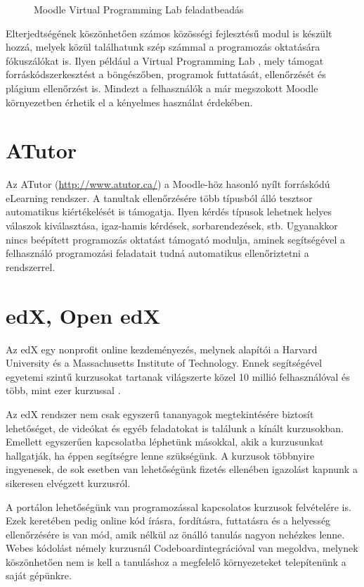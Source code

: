 \begin{figure}[h]
    \centering
    \caption{Moodle Virtual Programming Lab feladatbeadás}
    \label{fig:moodle_vpl}
\end{figure}

Elterjedtségének köszönhetően számos közösségi fejlesztésű modul is készült hozzá, melyek közül találhatunk szép számmal a programozás oktatására fókuszálókat is. Ilyen például a Virtual Programming Lab \cite{VPL} \cite{VPLJournal}, mely támogat forráskódszerkesztést a böngészőben, programok futtatását, ellenőrzését és plágium ellenőrzést is. Mindezt a felhasználók a már megszokott Moodle környezetben érhetik el a kényelmes használat érdekében.

\section{ATutor}

Az ATutor (\url{http://www.atutor.ca/}) a Moodle-höz hasonló nyílt forráskódú eLearning rendszer. A tanultak ellenőrzésére több típusból álló tesztsor automatikus kiértékelését is támogatja. Ilyen kérdés típusok lehetnek helyes válaszok kiválasztása, igaz-hamis kérdések, sorbarendezések, stb. Ugyanakkor nincs beépített programozás oktatást támogató modulja, aminek segítségével a felhasználó programozási feladatait tudná automatikus ellenőriztetni a rendszerrel.

\section{edX, Open edX}
Az edX \cite{EDXAbout} egy nonprofit online kezdeményezés, melynek alapítói a Harvard University és a Massachusetts Institute of Technology. Ennek segítségével egyetemi szintű kurzusokat tartanak világszerte közel 10 millió felhasználóval és több, mint ezer kurzussal \cite{EDXReview}.

Az edX rendszer nem csak egyszerű tananyagok megtekintésére biztosít lehetőséget, de videókat és egyéb feladatokat is találunk a kínált kurzusokban. Emellett egyszerűen kapcsolatba léphetünk másokkal, akik a kurzusunkat hallgatják, ha éppen segítségre lenne szükségünk. A kurzusok többnyire ingyenesek, de sok esetben van lehetőségünk fizetés ellenében igazolást kapnunk a sikeresen elvégzett kurzusról.

A portálon lehetőségünk van programozással kapcsolatos kurzusok felvételére is. Ezek keretében pedig online kód írásra, fordításra, futtatásra és a helyesség ellenőrzésére is van mód, amik nélkül az önálló tanulás nagyon nehézkes lenne. Webes kódolást némely kurzusnál Codeboard\footnotemark integrációval van megoldva, melynek köszönhetően nem is kell a tanuláshoz a megfelelő környezeteket telepítenünk a saját gépünkre.

